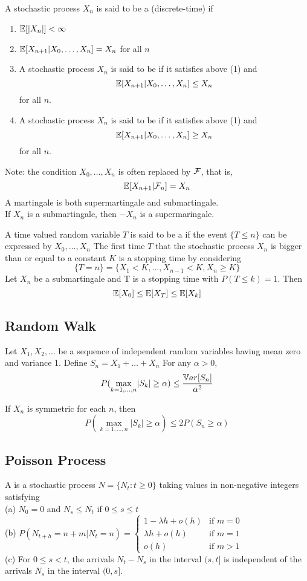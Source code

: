 \documentclass[11pt]{article}
\begin{document}
A stochastic process $X_n$ is said to be a (discrete-time)  if
\begin{enumerate}
	\item $\mathbb{E}[{|X_n|}] < \infty$
	\item $\mathbb{E}[{X_{n+1} | X_0, \hdots, X_n}] = X_n$ for all $n$
	\item A stochastic process $X_n$ is said to be  if it satisfies above (1) and
	$$\mathbb{E}[{X_{n+1} | X_0, \hdots, X_n}] \leq X_n$$ for all $n$.
	\item A stochastic process $X_n$ is said to be  if it satisfies above (1) and
	$$\mathbb{E}[{X_{n+1} | X_0, \hdots, X_n}] \geq X_n$$ for all $n$.
\end{enumerate}
Note: the condition $X_0, \hdots, X_n$ is often replaced by $\mathcal{F}$, that is,
$$\mathbb{E}[{X_{n+1}|\mathcal{F}_n}] = X_n$$
\remark A martingale is both supermartingale and submartingale. \\
If $X_n$ is a submartingale, then $-X_n$ is a supermaringale.

A time valued random variable $T$ is said to be a  if the event $\{T \leq n\}$ can be expressed by $X_0, \hdots, X_n$
\example
The first time $T$ that the stochastic process $X_n$ is bigger than or equal to a constant $K$ is a stopping time by considering
$$\{T = n\} = \{X_1 < K, \hdots, X_{n-1} < K, X_n \geq K\}$$
Let $X_n$ be a submartingale and T is a stopping time with $P(T \leq k) = 1$. Then
$$\mathbb{E}[{X_0}] \leq \mathbb{E}[{X_T}] \leq \mathbb{E}[{X_k}]$$

\subsection{Random Walk}
Let $X_1, X_2, \hdots$ be a sequence of independent random variables having mean zero and variance 1. Define $S_n = X_1 + \hdots + X_n$
\theorem
For any $\alpha > 0$,
$$P(\underset{k = 1,\hdots, n}{\max} |S_k| \geq \alpha) \leq \frac{\mathbb{V}ar[{S_n}]}{\alpha^2}$$

\theorem
If $X_n$ is symmetric for each $n$, then
$$P(\underset{k = 1,\hdots, n}{\max} |S_k| \geq \alpha) \leq 2P(S_n \geq \alpha)$$

\subsection{Poisson Process}
A  is a stochastic process $N = \{N_t: t \geq 0\}$ taking values in non-negative integers satisfying \\
(a) $N_0 = 0$ and $N_s \leq N_t$ if $0 \leq s \leq t$ \\
(b) $P(N_{t+h} = n+m |N_t = n) = \begin{cases}
	1 - \lambda h + o(h) &\text{if $m = 0$} \\
	\lambda h + o(h) &\text{if $m = 1$} \\
	o(h) &\text{if $m > 1$}
\end{cases}$ \\
(c) For $0 \leq s < t$, the arrivals $N_t - N_s$ in the interval $(s, t]$ is independent of the arrivals $N_s$ in the interval $(0, s]$.
\end{document}
